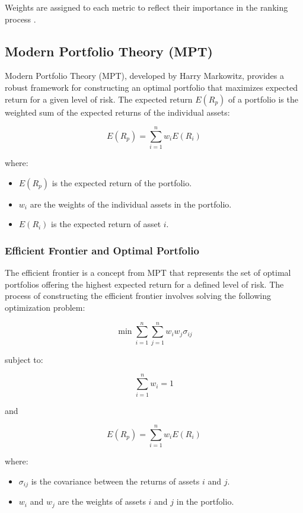 Weights are assigned to each metric to reflect their importance in the ranking process \citep{jones1992investments}.

\subsection{Modern Portfolio Theory (MPT)}
Modern Portfolio Theory (MPT), developed by Harry Markowitz, provides a robust framework for constructing an optimal portfolio that maximizes expected return for a given level of risk. The expected return $E(R_p)$ of a portfolio is the weighted sum of the expected returns of the individual assets:

\begin{equation}
E(R_p) = \sum_{i=1}^n w_iE(R_i)
\end{equation}

where:
\begin{itemize}
    \item $E(R_p)$ is the expected return of the portfolio.
    \item $w_i$ are the weights of the individual assets in the portfolio.
    \item $E(R_i)$ is the expected return of asset $i$.
\end{itemize}

\subsubsection{Efficient Frontier and Optimal Portfolio}
The efficient frontier is a concept from MPT that represents the set of optimal portfolios offering the highest expected return for a defined level of risk. The process of constructing the efficient frontier involves solving the following optimization problem:

\begin{equation}
\min \sum_{i=1}^n \sum_{j=1}^n w_i w_j \sigma_{ij}
\end{equation}

subject to:

\begin{equation}
\sum_{i=1}^n w_i = 1
\end{equation}

and

\begin{equation}
E(R_p) = \sum_{i=1}^n w_iE(R_i)
\end{equation}

where:
\begin{itemize}
    \item $\sigma_{ij}$ is the covariance between the returns of assets $i$ and $j$.
    \item $w_i$ and $w_j$ are the weights of assets $i$ and $j$ in the portfolio.
\end{itemize}

